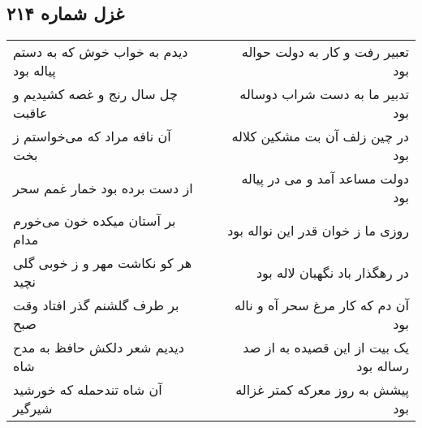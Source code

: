 \begin{center}
\section*{غزل شماره ۲۱۴}
\label{sec:sh214}
\begin{longtable}{l p{0.5cm} r}
دیدم به خواب خوش که به دستم پیاله بود
&&
تعبیر رفت و کار به دولت حواله بود
\\
چل سال رنج و غصه کشیدیم و عاقبت
&&
تدبیر ما به دست شراب دوساله بود
\\
آن نافه مراد که می‌خواستم ز بخت
&&
در چین زلف آن بت مشکین کلاله بود
\\
از دست برده بود خمار غمم سحر
&&
دولت مساعد آمد و می در پیاله بود
\\
بر آستان میکده خون می‌خورم مدام
&&
روزی ما ز خوان قدر این نواله بود
\\
هر کو نکاشت مهر و ز خوبی گلی نچید
&&
در رهگذار باد نگهبان لاله بود
\\
بر طرف گلشنم گذر افتاد وقت صبح
&&
آن دم که کار مرغ سحر آه و ناله بود
\\
دیدیم شعر دلکش حافظ به مدح شاه
&&
یک بیت از این قصیده به از صد رساله بود
\\
آن شاه تندحمله که خورشید شیرگیر
&&
پیشش به روز معرکه کمتر غزاله بود
\\
\end{longtable}
\end{center}
